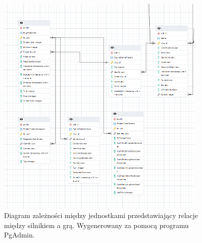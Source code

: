 \documentclass[12pt,a4paper]{article}
\begin{document}
\vspace{1cm}
\begin{figure}[h!]
    \centering
    \includegraphics[width=0.9\textwidth]{images/ERD_offline.png}
    \caption{Diagram zależności między jednostkami przedstawiający relacje między silnikiem a grą. Wygenerowany za pomocą programu PgAdmin.}
\end{figure}

\newpage
\end{document}
